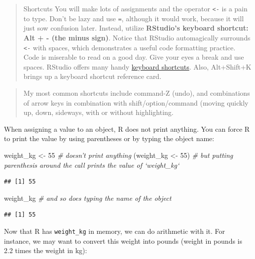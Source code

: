 \documentclass[]{book}
\newenvironment{Shaded}{\begin{snugshade}}{\end{snugshade}}
\newcommand{\DecValTok}[1]{\textcolor[rgb]{0.00,0.00,0.81}{{#1}}}
\newcommand{\StringTok}[1]{\textcolor[rgb]{0.31,0.60,0.02}{{#1}}}
\newcommand{\CommentTok}[1]{\textcolor[rgb]{0.56,0.35,0.01}{\textit{{#1}}}}
\newcommand{\NormalTok}[1]{{#1}}
\theoremstyle{definition}
\theoremstyle{definition}
\theoremstyle{definition}
\theoremstyle{remark}
\begin{document}
\begin{quote}
Shortcuts You will make lots of assignments and the operator
\texttt{\textless{}-} is a pain to type. Don't be lazy and use
\texttt{=}, although it would work, because it will just sow confusion
later. Instead, utilize \textbf{RStudio's keyboard shortcut: Alt + -
(the minus sign)}. Notice that RStudio automagically surrounds
\texttt{\textless{}-} with spaces, which demonstrates a useful code
formatting practice. Code is miserable to read on a good day. Give your
eyes a break and use spaces. RStudio offers many handy
\href{https://support.rstudio.com/hc/en-us/articles/200711853-Keyboard-Shortcuts}{keyboard
shortcuts}. Also, Alt+Shift+K brings up a keyboard shortcut reference
card.
\end{quote}

\begin{quote}
My most common shortcuts include command-Z (undo), and combinations of
arrow keys in combination with shift/option/command (moving quickly up,
down, sideways, with or without highlighting.
\end{quote}

When assigning a value to an object, R does not print anything. You can
force R to print the value by using parentheses or by typing the object
name:

\begin{Shaded}
\begin{Highlighting}[]
\NormalTok{weight_kg <-}\StringTok{ }\DecValTok{55}    \CommentTok{# doesn't print anything}
\NormalTok{(weight_kg <-}\StringTok{ }\DecValTok{55}\NormalTok{)  }\CommentTok{# but putting parenthesis around the call prints the value of `weight_kg`}
\end{Highlighting}
\end{Shaded}

\begin{verbatim}
## [1] 55
\end{verbatim}

\begin{Shaded}
\begin{Highlighting}[]
\NormalTok{weight_kg          }\CommentTok{# and so does typing the name of the object}
\end{Highlighting}
\end{Shaded}

\begin{verbatim}
## [1] 55
\end{verbatim}

Now that R has \texttt{weight\_kg} in memory, we can do arithmetic with
it. For instance, we may want to convert this weight into pounds (weight
in pounds is 2.2 times the weight in kg):
\end{document}
